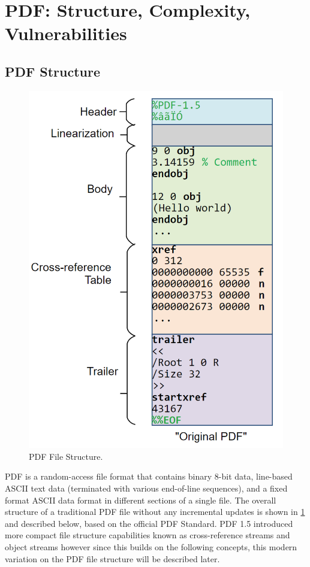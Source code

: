\section{PDF: Structure, Complexity, Vulnerabilities}
\label{sec:pdf}

\subsection{PDF Structure}
\label{sec:pdfstructure}

\begin{figure}[t]
    \centering
    \includegraphics[width=0.65\linewidth]{figures/pdf-structure.png}
    \caption{PDF File Structure.}
    \label{fig:pdf-structure}
\end{figure}

PDF is a random-access file format that contains binary 8-bit data, line-based ASCII
text data (terminated with various end-of-line sequences), and a fixed format ASCII 
data format in different sections of a single file. The overall structure of a 
traditional PDF file without any incremental updates is shown in \cref{fig:pdf-structure} and 
described below, based on the official PDF Standard.
PDF 1.5 introduced more compact file structure capabilities known as cross-reference streams 
and object streams however since this builds on the following concepts, this modern 
variation on the PDF file structure will be described later.

